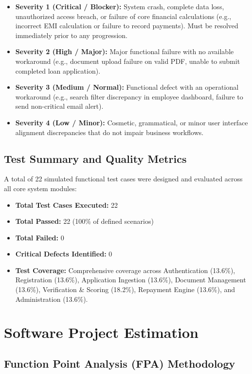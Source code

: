 \documentclass[12pt,a4paper,oneside]{report}
\begin{document}
\begin{itemize}
  \item \textbf{Severity 1 (Critical / Blocker):} System crash, complete data loss, unauthorized access breach, or failure of core financial calculations (e.g., incorrect EMI calculation or failure to record payments). Must be resolved immediately prior to any progression.
  \item \textbf{Severity 2 (High / Major):} Major functional failure with no available workaround (e.g., document upload failure on valid PDF, unable to submit completed loan application).
  \item \textbf{Severity 3 (Medium / Normal):} Functional defect with an operational workaround (e.g., search filter discrepancy in employee dashboard, failure to send non-critical email alert).
  \item \textbf{Severity 4 (Low / Minor):} Cosmetic, grammatical, or minor user interface alignment discrepancies that do not impair business workflows.
\end{itemize}

\section{Test Summary and Quality Metrics}

A total of 22 simulated functional test cases were designed and evaluated across all core system modules:

\begin{itemize}
  \item \textbf{Total Test Cases Executed:} 22
  \item \textbf{Total Passed:} 22 (100\% of defined scenarios)
  \item \textbf{Total Failed:} 0
  \item \textbf{Critical Defects Identified:} 0
  \item \textbf{Test Coverage:} Comprehensive coverage across Authentication (13.6\%), Registration (13.6\%), Application Ingestion (13.6\%), Document Management (13.6\%), Verification \& Scoring (18.2\%), Repayment Engine (13.6\%), and Administration (13.6\%).
\end{itemize}

\chapter{Software Project Estimation}

\section{Function Point Analysis (FPA) Methodology}
\end{document}

